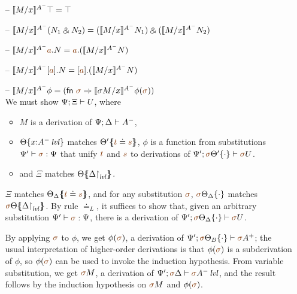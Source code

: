 \begin{itemize}
\smallskip

\item[--] $\rsubsta{M}{x}{\ttopr}{A^-} 
           = \ttopr$
\item[--] $\rsubsta{M}{x}{(\twithr{N_1}{N_2})}{A^-} 
           = \twithr{(\rsubsta{M}{x}{N_1}{A^-})}{(\rsubsta{M}{x}{N_2}{A^-})}$

\item[--] $\rsubsta{M}{x}{\texistsl{\lf a}{N}}{A^-} 
           = \texistsl{\lf a}{(\rsubsta{M}{x}{N}{A^-})}$
\item[--] $\rsubsta{M}{x}{\tforallr{\lf a}{N}}{A^-} 
           = \tforallr{\lf a}{(\rsubsta{M}{x}{N}{A^-})}$
\item[--] $\rsubsta{M}{x}{\phi}{A^-} 
           = ({\sf fn}~\lf\sigma \Rightarrow 
              \rsubsta{\sigma{M}}{x}{\phi(\lf\sigma)}{A^-})$\smallskip\\
  We must show $\foc{\Psi}{\Xi}{U}$, where
  \begin{itemize}
  \item $M$ is a derivation of $\foc{\Psi}{\Delta}{A^-}$, 
  \item $\tackon{\Theta}{x{:}\islvl{A^-}}$ matches 
     $\frameoff{\Theta'}{\lf t \doteq \lf s}$, $\phi$ 
     is a function from substitutions $\Psi' \vdash \lf \sigma : \Psi$
     that unify $\lf t$ and $\lf s$ to derivations of 
     $\foc{\Psi'}{\tackon{\lf \sigma\Theta'}{\cdot}}{\lf \sigma{U}}$.
  \item and $\Xi$ matches $\frameoff{\Theta}{\restrictto{\Delta}{\mlvl}}$.
  \end{itemize}

  $\Xi$ matches $\frameoff{\Theta_\Delta}{\lf t \doteq \lf s}$, and 
  for any substitution $\lf \sigma$, $\tackon{\lf \sigma\Theta_\Delta}{\cdot}$
  matches $\frameoff{\lf\sigma\Theta}{\restrictto{\Delta}{\mlvl}}$.
  By rule $\doteq_L$, it suffices to show that, given an arbitrary
  substitution $\Psi' \vdash \lf \sigma : \Psi$, there
  is a derivation of 
  $\foc{\Psi'}{\tackon{\lf\sigma\Theta_\Delta}{\cdot}}{\lf\sigma{U}}$.

  By applying $\lf\sigma$ to $\phi$, we get $\phi(\lf\sigma)$, a derivation 
  of $\foc{\Psi'}{\tackon{\lf\sigma\Theta_B}{\cdot}}{\lf\sigma{A^+}}$;
  the usual interpretation of higher-order derivations is that 
  $\phi(\lf\sigma)$ is a subderivation of $\phi$, so $\phi(\lf\sigma)$ can be
  used to invoke the induction hypothesis.
  From variable substitution, we get $\lf\sigma{M}$, a derivation
  of 
  $\foc{\Psi'}{\lf \sigma\Delta}{\islvl{\lf \sigma{A^-}}}$,
  and the result follows
  by the induction hypothesis on $\lf \sigma{M}$ and 
  $\phi(\lf \sigma)$.

\end{itemize}

